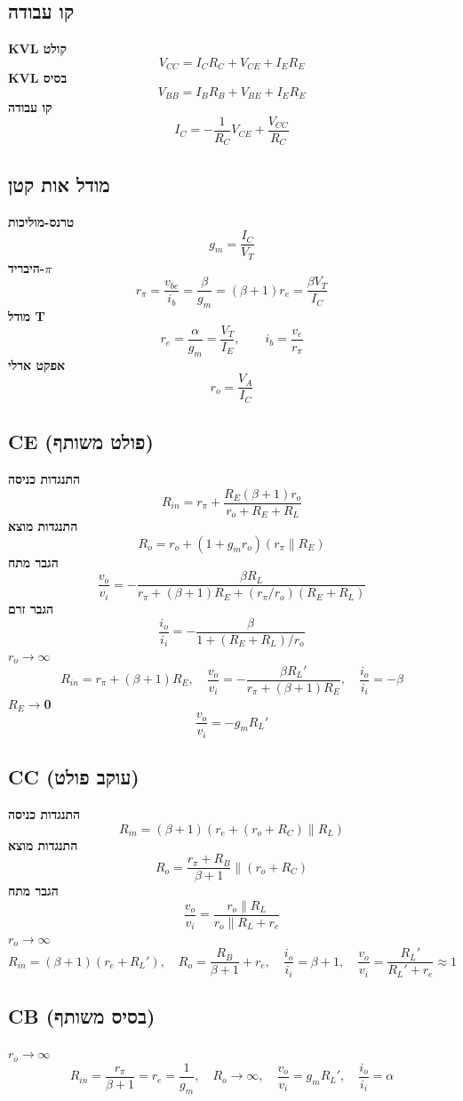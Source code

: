 \documentclass[11pt]{article}
\begin{document}
\subsection*{קו עבודה}
\textbf{KVL קולט}
\[V_{CC}=I_CR_C+V_{CE}+I_ER_E\]
\textbf{KVL בסיס}
\[V_{BB}=I_BR_B+V_{BE}+I_ER_E\]
\textbf{קו עבודה}
\[I_C=-\frac{1}{R_C}V_{CE}+\frac{V_{CC}}{R_C}\]
\subsection*{מודל אות קטן}
\textbf{טרנס-מוליכות}
\[g_m=\frac{I_C}{V_T}\]
\textbf{היבריד-$\pi$}
\[r_\pi=\frac{v_{be}}{i_b}=\frac{\beta}{g_m}=\left(\beta+1\right)r_e=\frac{\beta V_T}{I_C}\]
\textbf{מודל T}
\[r_e=\frac{\alpha}{g_m}=\frac{V_T}{I_E},\qquad i_b=\frac{v_e}{r_\pi}\]
\textbf{אפקט ארלי}
\[r_o=\frac{V_A}{I_C}\]
\subsection*{CE (פולט משותף)}
\textbf{התנגדות כניסה}
\[R_{in}=r_\pi+\frac{R_E\left(\beta+1\right)r_o}{r_o+R_E+R_L}\]
\textbf{התנגדות מוצא}
\[R_o=r_o+\left(1+g_mr_o\right)\left(r_\pi\parallel R_E\right)\]
\textbf{הגבר מתח}
\[\frac{v_o}{v_i}=-\frac{\beta R_L}{r_\pi+\left(\beta+1\right)R_E+\left(r_\pi/r_o\right)\left(R_E+R_L\right)}\]
\textbf{הגבר זרם}
\[\frac{i_o}{i_i}=-\frac{\beta}{1+\left(R_E+R_L\right)/r_o}\]
\textbf{$r_{o}$$\to$$\infty$}
\[R_{in}=r_\pi+\left(\beta+1\right)R_E,\quad \frac{v_o}{v_i}=-\frac{\beta R_L'}{r_\pi+\left(\beta+1\right)R_E},\quad \frac{i_o}{i_i}=-\beta\]
\textbf{$R_{E}$$\to$0}
\[\frac{v_o}{v_i}=-g_mR_L'\]
\subsection*{CC (עוקב פולט)}
\textbf{התנגדות כניסה}
\[R_{in}=\left(\beta+1\right)\left(r_e+\left(r_o+R_C\right)\parallel R_L\right)\]
\textbf{התנגדות מוצא}
\[R_o=\frac{r_\pi+R_B}{\beta+1}\parallel\left(r_o+R_C\right)\]
\textbf{הגבר מתח}
\[\frac{v_o}{v_i}=\frac{r_o\parallel R_L}{r_o\parallel R_L+r_e}\]
\textbf{$r_{o}$$\to$$\infty$}
\[R_{in}=\left(\beta+1\right)\left(r_e+R_L'\right),\quad R_o=\frac{R_B}{\beta+1}+r_e,\quad \frac{i_o}{i_i}=\beta+1,\quad \frac{v_o}{v_i}=\frac{R_L'}{R_L'+r_e}\approx1\]
\subsection*{CB (בסיס משותף)}
\textbf{$r_{o}$$\to$$\infty$}
\[R_{in}=\frac{r_\pi}{\beta+1}=r_e=\frac{1}{g_m},\quad R_o\to\infty,\quad \frac{v_o}{v_i}=g_mR_L',\quad \frac{i_o}{i_i}=\alpha\]
\end{document}
